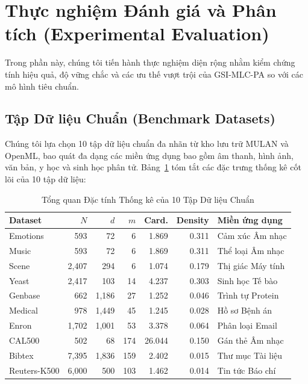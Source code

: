 \documentclass[11pt,a4paper]{article}
\begin{document}
\newpage
\section{Thực nghiệm Đánh giá và Phân tích (Experimental Evaluation)}
\label{sec:experiments}

Trong phần này, chúng tôi tiến hành thực nghiệm diện rộng nhằm kiểm chứng tính hiệu quả, độ vững chắc và các ưu thế vượt trội của GSI-MLC-PA so với các mô hình tiêu chuẩn.

\subsection{Tập Dữ liệu Chuẩn (Benchmark Datasets)}
Chúng tôi lựa chọn 10 tập dữ liệu chuẩn đa nhãn từ kho lưu trữ MULAN và OpenML, bao quát đa dạng các miền ứng dụng bao gồm âm thanh, hình ảnh, văn bản, y học và sinh học phân tử. Bảng~\ref{tab:datasets_summary} tóm tắt các đặc trưng thống kê cốt lõi của 10 tập dữ liệu:

\begin{table}[htbp]
\centering
\caption{Tổng quan Đặc tính Thống kê của 10 Tập Dữ liệu Chuẩn}
\label{tab:datasets_summary}
\small
\begin{tabular}{lrrrrrl}
\toprule
\textbf{Dataset} & \textbf{$N$} & \textbf{$d$} & \textbf{$m$} & \textbf{Card.} & \textbf{Density} & \textbf{Miền ứng dụng} \\
\midrule
Emotions & 593 & 72 & 6 & 1.869 & 0.311 & Cảm xúc Âm nhạc \\
Music & 593 & 72 & 6 & 1.869 & 0.311 & Thể loại Âm nhạc \\
Scene & 2,407 & 294 & 6 & 1.074 & 0.179 & Thị giác Máy tính \\
Yeast & 2,417 & 103 & 14 & 4.237 & 0.303 & Sinh học Tế bào \\
Genbase & 662 & 1,186 & 27 & 1.252 & 0.046 & Trình tự Protein \\
Medical & 978 & 1,449 & 45 & 1.245 & 0.028 & Hồ sơ Bệnh án \\
Enron & 1,702 & 1,001 & 53 & 3.378 & 0.064 & Phân loại Email \\
CAL500 & 502 & 68 & 174 & 26.044 & 0.150 & Gán thẻ Âm nhạc \\
Bibtex & 7,395 & 1,836 & 159 & 2.402 & 0.015 & Thư mục Tài liệu \\
Reuters-K500 & 6,000 & 500 & 103 & 1.462 & 0.014 & Tin tức Báo chí \\
\bottomrule
\end{tabular}
\end{table}
\end{document}
